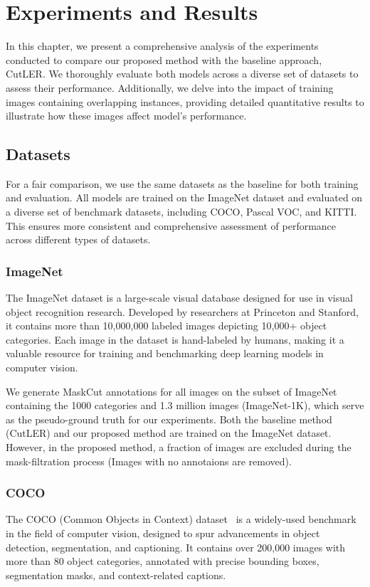 \chapter{Experiments and Results}\label{chap:experiments}
In this chapter, we present a comprehensive analysis of the experiments conducted to compare our proposed method with the baseline approach, CutLER. We thoroughly evaluate both models across a diverse set of datasets to assess their performance. Additionally, we delve into the impact of training images containing overlapping instances, providing detailed quantitative results to illustrate how these images affect model's performance. 

\section{Datasets}
For a fair comparison, we use the same datasets as the baseline for both training and evaluation. All models are trained on the ImageNet dataset and evaluated on a diverse set of benchmark datasets, including COCO, Pascal VOC, and KITTI. This ensures more consistent and comprehensive assessment of performance across different types of datasets.

\subsection{ImageNet}
The ImageNet dataset is a large-scale visual database designed for use in visual object recognition research. Developed by researchers at Princeton and Stanford, it contains more than 10,000,000 labeled images depicting 10,000+ object categories. Each image in the dataset is hand-labeled by humans, making it a valuable resource for training and benchmarking deep learning models in computer vision.

We generate MaskCut annotations for all images on the subset of ImageNet containing the 1000 categories and 1.3 million images (ImageNet-1K), which serve as the pseudo-ground truth for our experiments. Both the baseline method (CutLER) and our proposed method are trained on the ImageNet dataset. However, in the proposed method, a fraction of images are excluded during the mask-filtration process (Images with no annotaions are removed).

\subsection{COCO}
The COCO (Common Objects in Context) dataset~\cite{lin2015microsoftcococommonobjects} is a widely-used benchmark in the field of computer vision, designed to spur advancements in object detection, segmentation, and captioning. It contains over 200,000 images with more than 80 object categories, annotated with precise bounding boxes, segmentation masks, and context-related captions. 

